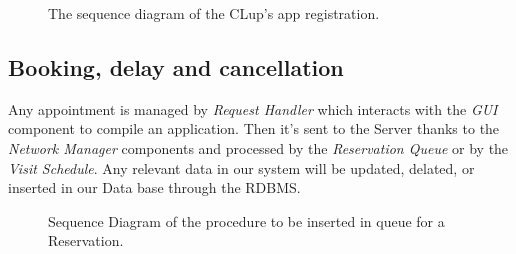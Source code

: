 \begin{figure}[H]
  \label{RegistrationSD}
  \centering
    \caption{The sequence diagram of the CLup's app registration.}
\end{figure} 

\subsection{Booking, delay and cancellation}

Any appointment is managed by \textit{Request Handler} which interacts with the \textit{GUI} component to compile an application. Then it's sent to the Server thanks to the \textit{Network Manager} components and processed by the \textit{Reservation Queue} or by the \textit{Visit Schedule}. Any relevant data in our system will be updated, delated, or inserted in our Data base through the RDBMS.


\begin{figure}[H]
  \label{ReservatioSD}
  \centering
    \caption{Sequence Diagram of the procedure to be inserted in queue for a Reservation.}
      \label{ReservatioSD}

\end{figure} 



